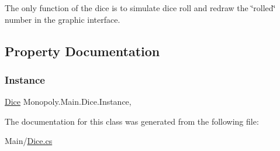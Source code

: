 The only function of the dice is to simulate dice roll and redraw the \char`\"{}rolled\char`\"{} number in the graphic interface. 

\subsection{Property Documentation}
\mbox{\label{class_monopoly_1_1_main_1_1_dice_ae4123f0a19934c8b5abb5e440787fe6f}} 
\subsubsection{\texorpdfstring{Instance}{Instance}}
{\footnotesize\ttfamily \mbox{\hyperlink{class_monopoly_1_1_main_1_1_dice}{Dice}} Monopoly.\+Main.\+Dice.\+Instance\hspace{0.3cm}{\ttfamily [static]}, {\ttfamily [get]}}



The documentation for this class was generated from the following file\+:\begin{DoxyCompactItemize}
\item 
Main/\mbox{\hyperlink{_dice_8cs}{Dice.\+cs}}\end{DoxyCompactItemize}
